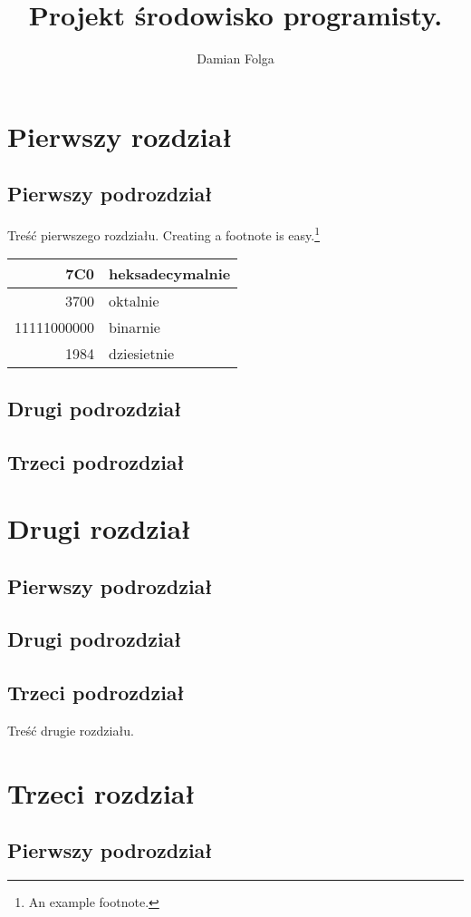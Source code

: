 \documentclass[12pt,a4paper,titlepage]{report}
\author{Damian Folga}
\title{Projekt środowisko programisty.}
\begin{document}
\maketitle
\tableofcontents
\newpage
\chapter{Pierwszy rozdział}
\section{Pierwszy podrozdział}
Treść pierwszego rozdziału.
Creating a footnote is easy.\footnote{An example footnote.}

\begin{tabular}{|r|l|} \hline
7C0 & heksadecymalnie \\
\hline \hline
3700 & oktalnie \\
\hline \hline
11111000000 & binarnie \\
\hline \hline
1984 & dziesietnie \\ \hline
\end{tabular}

\section{Drugi podrozdział}
\section{Trzeci podrozdział}
\newpage
\chapter{Drugi rozdział}
\section{Pierwszy podrozdział}
\section{Drugi podrozdział}
\section{Trzeci podrozdział}
Treść drugie rozdziału.

\newpage
\chapter{Trzeci rozdział}
\section{Pierwszy podrozdział}
\end{document}
